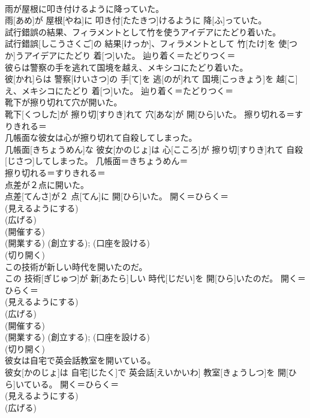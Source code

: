 \documentclass[8pt]{extreport}
\begin{document}
\begin{CJK}{UTF8}{min}
{\\	雨が屋根に叩き付けるように降っていた。	
\\	雨[あめ]が 屋根[やね]に 叩き付[たたきつ]けるように 降[ふ]っていた。	
\\	試行錯誤の結果、フィラメントとして竹を使うアイデアにたどり着いた。	
\\	試行錯誤[しこうさくご]の 結果[けっか]、フィラメントとして 竹[たけ]を 使[つか]うアイデアにたどり 着[つ]いた。	辿り着く＝たどりつく＝ 
\\	彼らは警察の手を逃れて国境を越え、メキシコにたどり着いた。	
\\	彼[かれ]らは 警察[けいさつ]の 手[て]を 逃[のが]れて 国境[こっきょう]を 越[こ]え、メキシコにたどり 着[つ]いた。	辿り着く＝たどりつく＝ 
\\	靴下が擦り切れて穴が開いた。	
\\	靴下[くつした]が 擦り切[すりき]れて 穴[あな]が 開[ひら]いた。	擦り切れる＝すりきれる＝ 
\\	几帳面な彼女は心が擦り切れて自殺してしまった。	
\\	几帳面[きちょうめん]な 彼女[かのじょ]は 心[こころ]が 擦り切[すりき]れて 自殺[じさつ]してしまった。	几帳面＝きちょうめん＝ 
\\	擦り切れる＝すりきれる＝ 
\\	点差が２点に開いた。	
\\	点差[てんさ]が２ 点[てん]に 開[ひら]いた。	開く＝ひらく＝ 
\\	(見えるようにする) 
\\	(広げる) 
\\	(開催する) 
\\	(開業する) (創立する); (口座を設ける) 
\\	(切り開く) 
\\	この技術が新しい時代を開いたのだ。	
\\	この 技術[ぎじゅつ]が 新[あたら]しい 時代[じだい]を 開[ひら]いたのだ。	開く＝ひらく＝ 
\\	(見えるようにする) 
\\	(広げる) 
\\	(開催する) 
\\	(開業する) (創立する); (口座を設ける) 
\\	(切り開く) 
\\	彼女は自宅で英会話教室を開いている。	
\\	彼女[かのじょ]は 自宅[じたく]で 英会話[えいかいわ] 教室[きょうしつ]を 開[ひら]いている。	開く＝ひらく＝ 
\\	(見えるようにする) 
\\	(広げる) 
}
\end{CJK}
\end{document}
